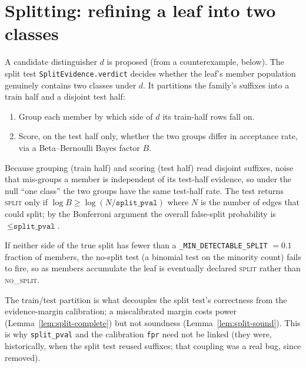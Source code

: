 \section{Splitting: refining a leaf into two classes}

A candidate distinguisher $d$ is proposed (from a counterexample, below). The
split test \texttt{SplitEvidence.verdict} decides whether the leaf's member
population genuinely contains two classes under $d$. It partitions the family's
suffixes into a train half and a disjoint test half:

\begin{enumerate}
\item Group each member by which side of $d$ its train-half rows fall on.
\item Score, on the test half only, whether the two groups differ in
acceptance rate, via a Beta--Bernoulli Bayes factor $B$.
\end{enumerate}

\begin{lemma}\label{lem:split-sound}
Because grouping (train half) and scoring (test half) read disjoint suffixes,
noise that mis-groups a member is independent of its test-half evidence, so under
the null ``one class'' the two groups have the same test-half rate. The test
returns \textsc{split} only if $\log B \ge \log(N/\texttt{split\_pval})$ where $N$
is the number of edges that could split; by the Bonferroni argument the overall
false-split probability is $\le \texttt{split\_pval}$.
\end{lemma}

\begin{lemma}\label{lem:split-complete}
If neither side of the true split has fewer than a \texttt{\_MIN\_DETECTABLE\_SPLIT}
$=0.1$ fraction of members, the no-split test (a binomial test on the minority
count) fails to fire, so as members accumulate the leaf is eventually declared
\textsc{split} rather than \textsc{no\_split}.
\end{lemma}

\begin{remark}
The train/test partition is what decouples the split test's correctness from the
evidence-margin calibration; a miscalibrated margin costs power
(Lemma~\ref{lem:split-complete}) but not soundness
(Lemma~\ref{lem:split-sound}). This is why \texttt{split\_pval} and the
calibration \texttt{fpr} need not be linked (they were, historically, when the
split test reused suffixes; that coupling was a real bug, since removed).
\end{remark}
